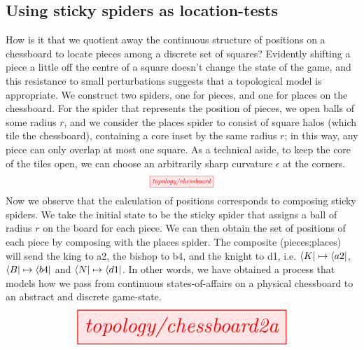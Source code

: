 \subsection{Using sticky spiders as location-tests}

\begin{myboxB}
\begin{example}\label{ex:chessboard}
How is it that we quotient away the continuous structure of positions on a chessboard to locate pieces among a discrete set of squares? Evidently shifting a piece a little off the centre of a square doesn't change the state of the game, and this resistance to small perturbations suggests that a topological model is appropriate. We construct two spiders, one for pieces, and one for places on the chessboard. For the spider that represents the position of pieces, we open balls of some radius $r$, and we consider the places spider to consist of square halos (which tile the chessboard), containing a core inset by the same radius $r$; in this way, any piece can only overlap at most one square. As a technical aside, to keep the core of the tiles open, we can choose an arbitrarily sharp curvature $\epsilon$ at the corners.
\[\scalebox{0.70}{\tikzfig{topology/chessboard}}\]
Now we observe that the calculation of positions corresponds to composing sticky spiders. We take the initial state to be the sticky spider that assigns a ball of radius $r$ on the board for each piece. We can then obtain the set of positions of each piece by composing with the places spider. The composite (pieces;places)
will send the king to a2, the bishop to b4, and the knight to d1, i.e. $\bra{K} \mapsto \bra{a2}$, $\bra{B} \mapsto \bra{b4}$ and $\bra{N} \mapsto \bra{d1}$. In other words, we have obtained a process that models how we pass from continuous states-of-affairs on a physical chessboard to an abstract and discrete game-state.
\[\resizebox{0.70\textwidth}{!}{\tikzfig{topology/chessboard2a}}\]
\end{example}
\end{myboxB}

\clearpage

